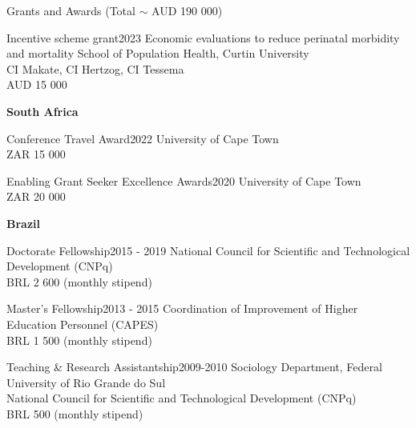 \begin{rSection}{Grants and Awards (Total $\sim$ AUD 190 000)}
\begin{rSubsection}
{Incentive scheme grant}{2023}
{Economic evaluations to reduce perinatal morbidity and mortality}
{School of Population Health, Curtin University}\\
{CI Makate, CI Hertzog, CI Tessema}\\
{AUD 15 000}
\end{rSubsection}

\vspace{1em}

\begin{center}
\large \textbf{South Africa}
\end{center}

\par

\begin{rSubsection}
{Conference Travel Award}{2022}
{University of Cape Town}\\
{ZAR 15 000}
\end{rSubsection}

\begin{rSubsection}
{Enabling Grant Seeker Excellence Awards}{2020}
{University of Cape Town}\\
{ZAR 20 000}
\end{rSubsection}

\vspace{1em}

\begin{center}
\large \textbf {Brazil}
\end{center}

\par

\begin{rSubsection}
{Doctorate Fellowship}{2015 - 2019}
{National Council for Scientific and Technological Development (CNPq)}\\
{BRL 2 600 (monthly stipend)}
\end{rSubsection}

\begin{rSubsection}
{Master’s Fellowship}{2013 - 2015}
{Coordination of Improvement of Higher Education Personnel (CAPES)}\\
{BRL 1 500 (monthly stipend)}
\end{rSubsection}

\begin{rSubsection}
{Teaching \& Research Assistantship}{2009-2010}
{Sociology Department, Federal University of Rio Grande do Sul}\\
{National Council for Scientific and Technological Development (CNPq)}\\
{BRL 500 (monthly stipend)}
\end{rSubsection}


\end{rSection}
